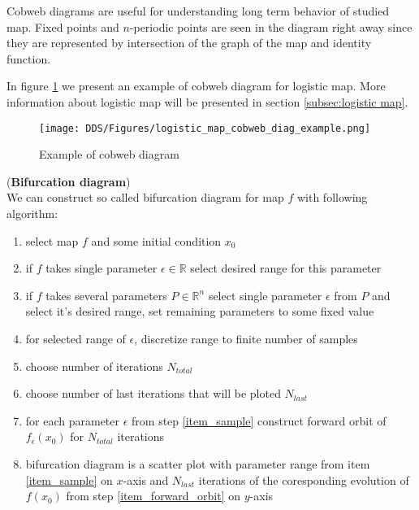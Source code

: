 \begin{remark}
    Cobweb diagrams are useful for understanding long term behavior of studied map.
    Fixed points and $n$-periodic points are seen in the diagram right away since they are represented by intersection of the graph of the map and identity function.
\end{remark}

\begin{example}
    In figure \ref{fig:cobweb_diag_example} we present an example of cobweb diagram for logistic map. More information about logistic map will be presented in section \ref{subsec:logistic map}.
    \begin{figure}[!h]
        \centering
        \texttt{[image: DDS/Figures/logistic\_map\_cobweb\_diag\_example.png]}
        \caption{Example of cobweb diagram}
        \label{fig:cobweb_diag_example}
    \end{figure}
\end{example}

\begin{definition} (\textbf{Bifurcation diagram}) \\
    \label{def: bif_diag}
    We can construct so called bifurcation diagram for map $f$ with following algorithm:
    \begin{enumerate}
        \item select map $f$ and some initial condition $x_0$
        \item if $f$ takes single parameter $\epsilon \in \mathbb{R}$ select desired range for this parameter
        \item if $f$ takes several parameters $P \in \mathbb{R}^n$ select single parameter $\epsilon$ from $P$ and select it's desired range, set remaining parameters to some fixed value
        \item for selected range of $\epsilon$, discretize range to finite number of samples \label{item_sample}
        \item choose number of iterations $N_{total}$
        \item choose number of last iterations that will be ploted $N_{last}$
        \item for each parameter $\epsilon$ from step \ref{item_sample} construct forward orbit of $f_{\epsilon}(x_0)$ for $N_{total}$ iterations \label{item_forward_orbit}
        \item bifurcation diagram is a scatter plot with parameter range from item \ref{item_sample} on $x$-axis and $N_{last}$ iterations of the coresponding evolution of $f(x_0)$ from step \ref{item_forward_orbit} on $y$-axis
    \end{enumerate}
\end{definition}

